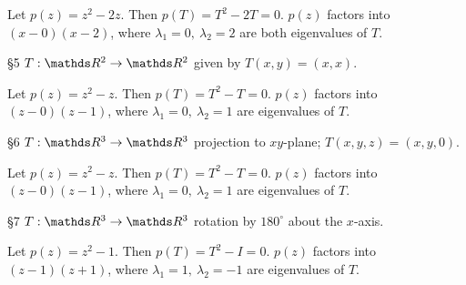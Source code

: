 \documentclass{review-sheet}
\begin{document}
\begin{solution}
  Let $p(z)=z^2-2z$. Then $p(T)=T^2-2T=0$. $p(z)$ factors into $(x-0)(x-2)$, where $\lambda_1=0,\
  \lambda_2=2$ are both eigenvalues of $T$.
\end{solution}

\begin{problem}{\S 5}
  $T:\R^2\to \R^2$ given by $T(x,y)=(x,x)$.
\end{problem}
\begin{solution}
  Let $p(z)=z^2-z$. Then $p(T)=T^2-T=0$. $p(z)$ factors into $(z-0)(z-1)$, where $\lambda_1=0,\
  \lambda_2=1$ are eigenvalues of $T$.
\end{solution}

\begin{problem}{\S 6}
  $T:\R^3\to \R^3$ projection to $xy$-plane; $T(x,y,z)=(x,y,0)$.
\end{problem}
\begin{solution}
  Let $p(z)=z^2-z$. Then $p(T)=T^2-T=0$. $p(z)$ factors into $(z-0)(z-1)$, where $\lambda_1=0,\
  \lambda_2=1$ are eigenvalues of $T$.
\end{solution}

\begin{problem}{\S 7}
  $T:\R^3\to \R^3$ rotation by $180^{\circ}$ about the $x$-axis.
\end{problem}

\begin{solution}
  Let $p(z)=z^2-1$. Then $p(T)=T^2-I=0$. $p(z)$ factors into $(z-1)(z+1)$, where $\lambda_1=1,\
  \lambda_2=-1$ are eigenvalues of $T$.
\end{solution}
\end{document}
